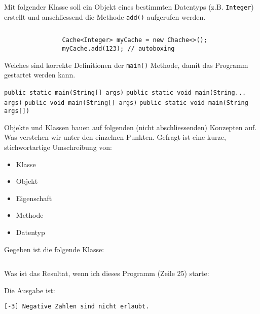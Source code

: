 \documentclass[12pt,a4paper]{exam}
\begin{document}
\begin{questions}
        \newpage
        \question[10]
        Mit folgender Klasse soll ein Objekt eines bestimmten Datentyps (z.B.
        \texttt{Integer}) erstellt und anschliessend die Methode
        \texttt{add()} aufgerufen werden.
        \inputminted[autogobble,linenos,firstline=3]{java}{../java/generics/Cache.java}

        \ifprintanswers
        \begin{solution}
            \begin{verbatim}
                Cache<Integer> myCache = new Chache<>();
                myCache.add(123); // autoboxing
            \end{verbatim}
        \end{solution}
        \else\makeemptybox{2in}
        \fi

        {%
        \checkboxchar{$\Box$} %
        \question[4] Welches sind korrekte Definitionen der \texttt{main()} Methode,
        damit das Programm gestartet werden kann.
        \addpoints
        \begin{checkboxes}
            \choice \texttt{public static main(String[] args)}
            \CorrectChoice \texttt{public static void main(String... args)}
            \choice \texttt{public void main(String[] args)}
            \CorrectChoice \texttt{public static void main(String args[])}
        \end{checkboxes}
        }%

        \newpage
        \question[10]
        Objekte und Klassen bauen auf folgenden (nicht abschliessenden) Konzepten auf.
        Was verstehen wir unter den einzelnen Punkten. Gefragt ist eine kurze, stichwortartige
        Umschreibung von:
        \begin{itemize}
            \item Klasse
            \item Objekt
            \item Eigenschaft
            \item Methode
            \item Datentyp
        \end{itemize}
        \makeemptybox{\fill}

        \newpage
        \question[10]
        Gegeben ist die folgende Klasse:
        \inputminted[autogobble,linenos]{java}{../java/academy/calculator/InputValidator.java}

        Was ist das Resultat, wenn ich dieses Programm (Zeile 25) starte:

        \ifprintanswers
        \begin{solution}
            Die Ausgabe ist:

            \texttt{[-3] Negative Zahlen sind nicht erlaubt.}
        \end{solution}
        \else\makeemptybox{\fill}
        \fi

    \end{questions}
\end{document}
